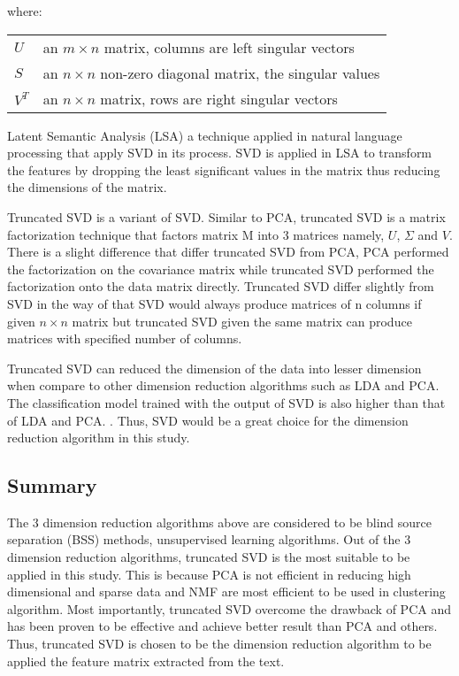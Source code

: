 where:
\begin{center}
	\begin{tabular}{l @{ $=$ } l}
		$U$ & an $m \times n$ matrix, columns are left singular vectors \\
		$S$ & an $n \times n$ non-zero diagonal matrix, the singular values \\
		$V^{T}$ & an $n \times n$ matrix, rows are right singular vectors \\
	\end{tabular}
\end{center}

	
Latent Semantic Analysis (LSA) a technique applied in natural language processing that apply SVD in its process. SVD is applied in LSA to transform the features by dropping the least significant values in the matrix thus reducing the dimensions of the matrix. \cite{fuzzyLash}

Truncated SVD is a variant of SVD. Similar to PCA, truncated SVD is a matrix factorization technique that factors matrix M into 3 matrices namely, $U$, $\Sigma$ and $V$. There is a slight difference that differ truncated SVD from PCA, PCA performed the factorization on the covariance matrix while truncated SVD performed the factorization onto the data matrix directly. Truncated SVD differ slightly from SVD in the way of that SVD would always produce matrices of n columns if given $n \times n$ matrix but truncated SVD given the same matrix can produce matrices with specified number of columns. \cite{truncatedSVD}

Truncated SVD can reduced the dimension of the data into lesser dimension when compare to other dimension reduction algorithms such as LDA and PCA. The classification model trained with the output of SVD is also higher than that of LDA and PCA. \cite{dimRedCat}. Thus, SVD would be a great choice for the dimension reduction algorithm in this study.\\
	
\subsection{Summary}
The 3 dimension reduction algorithms above are considered to be blind source separation (BSS) methods, unsupervised learning algorithms. Out of the 3 dimension reduction algorithms, truncated SVD is the most suitable to be applied in this study. This is because PCA is not efficient in reducing high dimensional and sparse data and NMF are most efficient to be used in clustering algorithm. Most importantly, truncated SVD overcome the drawback of PCA and has been proven to be effective and achieve better result than PCA and others. Thus, truncated SVD is chosen to be the dimension reduction algorithm to be applied the feature matrix extracted from the text.\\

